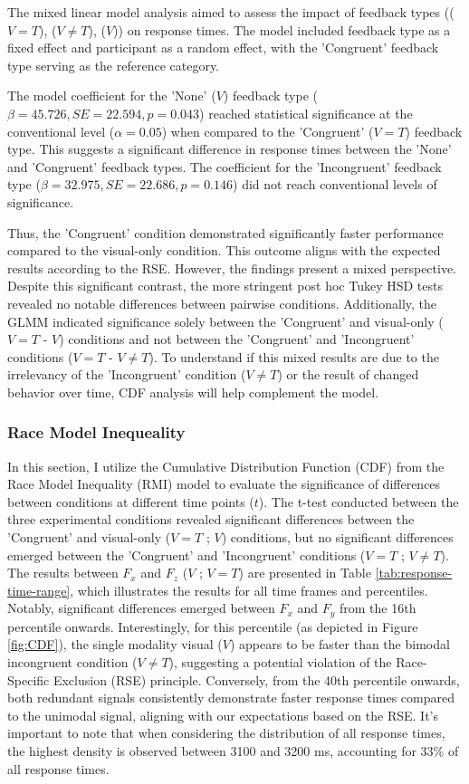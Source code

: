 \documentclass[12pt,oneside,openright]{report}
\begin{document}
The mixed linear model analysis aimed to assess the impact of feedback types (($V=T$), ($V \neq T$), ($V$)) on response times. The model included feedback type as a fixed effect and participant as a random effect, with the 'Congruent' feedback type serving as the reference category.

The model coefficient for the 'None' ($V$) feedback type ($\beta = 45.726, SE = 22.594, p = 0.043$) reached statistical significance at the conventional level ($\alpha =0.05 $) when compared to the 'Congruent' ($V=T$) feedback type. This suggests a significant difference in response times between the 'None' and 'Congruent' feedback types. The coefficient for the 'Incongruent' feedback type ($\beta = 32.975, SE = 22.686, p = 0.146$) did not reach conventional levels of significance.

Thus, the 'Congruent' condition demonstrated significantly faster performance compared to the visual-only condition. This outcome aligns with the expected results according to the RSE. However, the findings present a mixed perspective. Despite this significant contrast, the more stringent post hoc Tukey HSD tests revealed no notable differences between pairwise conditions. Additionally, the GLMM indicated significance solely between the 'Congruent' and visual-only ($V=T$ - $V$) conditions and not between the 'Congruent' and 'Incongruent' conditions ($V=T$ - $V \neq T$). To understand if this mixed results are due to the irrelevancy of the 'Incongruent' condition ($V \neq T$) or the result of changed behavior over time, CDF analysis will help complement the model.

\subsubsection*{Race Model Inequeality}

In this section, I utilize the Cumulative Distribution Function (CDF) from the Race Model Inequality (RMI) model to evaluate the significance of differences between conditions at different time points ($t$). The t-test conducted between the three experimental conditions revealed significant differences between the 'Congruent' and visual-only ($V=T$ ; $V$) conditions, but no significant differences emerged between the 'Congruent' and 'Incongruent' conditions ($V=T$ ; $V \neq T$). The results between $F_x$ and $F_z$ ($V$ ; $V=T$) are presented in Table \ref{tab:response-time-range}, which illustrates the results for all time frames and percentiles. Notably, significant differences emerged between $F_x$ and $F_y$ from the 16th percentile onwards. Interestingly, for this percentile (as depicted in Figure \ref{fig:CDF}), the single modality visual ($V$) appears to be faster than the bimodal incongruent condition ($V \neq T$), suggesting a potential violation of the Race-Specific Exclusion (RSE) principle. Conversely, from the 40th percentile onwards, both redundant signals consistently demonstrate faster response times compared to the unimodal signal, aligning with our expectations based on the RSE. It's important to note that when considering the distribution of all response times, the highest density is observed between 3100 and 3200 ms, accounting for 33\% of all response times.
 
\end{document}
